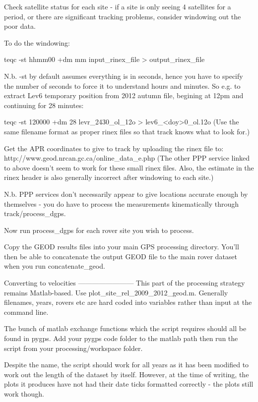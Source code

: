\documentclass[11pt]{article} %
\begin{document}
Check satellite status for each site - if a site is only seeing 4 satellites for a period, or there are significant tracking problems, consider windowing out the poor data.  

To do the windowing:

  teqc -st hhmm00 +dm mm input_rinex_file > output_rinex_file
  
N.b. -st by default assumes everything is in seconds, hence you have to specify the number of seconds to force it to understand hours and minutes. So e.g. to extract Lev6 temporary position from 2012 autumn file, begining at 12pm and continuing for 28 minutes:

  teqc -st 120000 +dm 28 levr_2430_ol_12o > lev6_<doy>0_ol.12o
(Use the same filename format as proper rinex files so that track knows what to look for.)
  
Get the APR coordinates to give to track by uploading the rinex file to:
http://www.geod.nrcan.gc.ca/online_data_e.php
(The other PPP service linked to above doesn't seem to work for these small rinex files. Also, the estimate in the rinex header is also generally incorrect after windowing to each site.)

N.b. PPP services don't necessarily appear to give locations accurate enough by themselves - you do have to process the measurements kinematically through track/process_dgps.
 
Now run process_dgps for each rover site you wish to process.

Copy the GEOD results files into your main GPS processing directory. You'll then be able to concatenate the output GEOD file to the main rover dataset when you run concatenate_geod. 
  
  
  
Converting to velocities
------------------------
This part of the processing strategy remains Matlab-based. Use plot_site_rel_2009_2012_geod.m. Generally filenames, years, rovers etc are hard coded into variables rather than input at the command line.

The bunch of matlab exchange functions which the script requires should all be found in pygps. Add your pygps code folder to the matlab path then run the script from your processing/workspace folder.

Despite the name, the script should work for all years as it has been modified to work out the length of the dataset by itself. However, at the time of writing, the plots it produces have not had their date ticks formatted correctly - the plots still work though.
\end{document}
